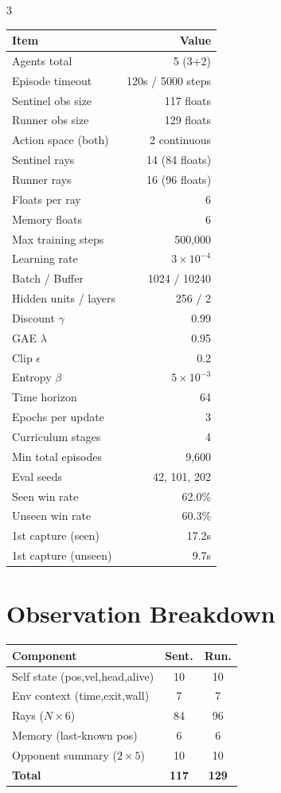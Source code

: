 \documentclass[10pt,landscape,a4paper]{article}
\begin{document}
\begin{multicols}{3}
\begin{tabular}{@{}lr@{}}
\toprule
\textbf{Item} & \textbf{Value} \\
\midrule
Agents total & 5 (3+2) \\
Episode timeout & 120s / 5000 steps \\
Sentinel obs size & 117 floats \\
Runner obs size & 129 floats \\
Action space (both) & 2 continuous \\
Sentinel rays & 14 (84 floats) \\
Runner rays & 16 (96 floats) \\
Floats per ray & 6 \\
Memory floats & 6 \\
Max training steps & 500,000 \\
Learning rate & $3 \times 10^{-4}$ \\
Batch / Buffer & 1024 / 10240 \\
Hidden units / layers & 256 / 2 \\
Discount $\gamma$ & 0.99 \\
GAE $\lambda$ & 0.95 \\
Clip $\epsilon$ & 0.2 \\
Entropy $\beta$ & $5 \times 10^{-3}$ \\
Time horizon & 64 \\
Epochs per update & 3 \\
Curriculum stages & 4 \\
Min total episodes & 9,600 \\
Eval seeds & 42, 101, 202 \\
Seen win rate & 62.0\% \\
Unseen win rate & 60.3\% \\
1st capture (seen) & 17.2s \\
1st capture (unseen) & 9.7s \\
\bottomrule
\end{tabular}

\section{Observation Breakdown}

\begin{tabular}{@{}lcc@{}}
\toprule
Component & Sent. & Run. \\
\midrule
Self state (pos,vel,head,alive) & 10 & 10 \\
Env context (time,exit,wall) & 7 & 7 \\
Rays ($N \times 6$) & 84 & 96 \\
Memory (last-known pos) & 6 & 6 \\
Opponent summary ($2 \times 5$) & 10 & 10 \\
\midrule
\textbf{Total} & \textbf{117} & \textbf{129} \\
\bottomrule
\end{tabular}


\end{multicols}
\end{document}
